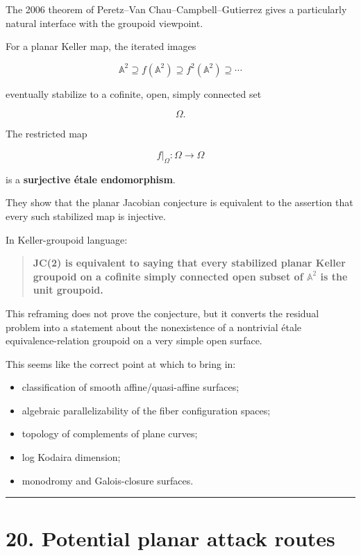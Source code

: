 The 2006 theorem of Peretz--Van Chau--Campbell--Gutierrez gives a
particularly natural interface with the groupoid viewpoint.

For a planar Keller map, the iterated images

\[
\mathbb A^2\supseteq f(\mathbb A^2)\supseteq f^2(\mathbb A^2)\supseteq\cdots
\]

eventually stabilize to a cofinite, open, simply connected set

\[
\Omega.
\]

The restricted map

\[
f|_\Omega\colon\Omega\to\Omega
\]

is a \textbf{surjective étale endomorphism}.

They show that the planar Jacobian conjecture is equivalent to the
assertion that every such stabilized map is injective.

In Keller-groupoid language:

\begin{quote}
\textbf{JC(2) is equivalent to saying that every stabilized planar
Keller groupoid on a cofinite simply connected open subset of
\(\mathbb A^2\) is the unit groupoid.}
\end{quote}

This reframing does not prove the conjecture, but it converts the
residual problem into a statement about the nonexistence of a nontrivial
étale equivalence-relation groupoid on a very simple open surface.

This seems like the correct point at which to bring in:

\begin{itemize}
\tightlist
\item
  classification of smooth affine/quasi-affine surfaces;
\item
  algebraic parallelizability of the fiber configuration spaces;
\item
  topology of complements of plane curves;
\item
  log Kodaira dimension;
\item
  monodromy and Galois-closure surfaces.
\end{itemize}

\begin{center}\rule{0.5\linewidth}{0.5pt}\end{center}

\section{20. Potential planar attack
routes}\label{potential-planar-attack-routes}


